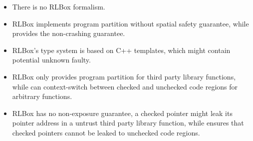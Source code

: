 \begin{itemize}
\item There is no RLBox formalism.
\item RLBox implements program partition without spatial safety guarantee, while \systemname provides the non-crashing guarantee.
\item RLBox's type system is based on C++ templates, which might contain potential unknown faulty.
\item RLBox only provides program partition for third party library functions, while \systemname can context-switch between checked and unchecked code regions for arbitrary functions.
\item RLBox has no non-exposure guarantee, a checked pointer might leak its pointer address in a untrust third party library function, while \systemname ensures that checked pointers cannot be leaked to unchecked code regions.
\end{itemize}



